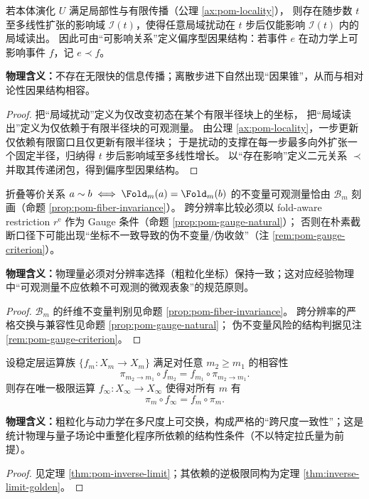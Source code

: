 \begin{physicalaxiom}[局域性与有限传播所诱导的因果律]\label{ax:P3-causality}
若本体演化 \(U\) 满足局部性与有限传播（公理 \ref{ax:pom-locality}），
则存在随步数 \(t\) 至多线性扩张的影响域 \(\mathcal{I}(t)\)，使得任意局域扰动在 \(t\) 步后仅能影响 \(\mathcal{I}(t)\) 内的局域读出。
因此可由“可影响关系”定义偏序型因果结构：若事件 \(e\) 在动力学上可影响事件 \(f\)，记 \(e\prec f\)。

\medskip\noindent\textbf{物理含义：}不存在无限快的信息传播；离散步进下自然出现“因果锥”，从而与相对论性因果结构相容。
\end{physicalaxiom}
\begin{proof}
把“局域扰动”定义为仅改变初态在某个有限半径块上的坐标，
把“局域读出”定义为仅依赖于有限半径块的可观测量。
由公理 \ref{ax:pom-locality}，一步更新仅依赖有限窗口且仅更新有限半径块；
于是扰动的支撑在每一步最多向外扩张一个固定半径，归纳得 \(t\) 步后影响域至多线性增长。
以“存在影响”定义二元关系 \(\prec\) 并取其传递闭包，得到偏序型因果结构。
\end{proof}

\begin{physicalaxiom}[跨分辨率可审计性与规范不变性]\label{ax:P4-gauge}
折叠等价关系 \(a\sim b\iff \Fold_m(a)=\Fold_m(b)\) 的不变量可观测量恰由 \(\mathcal{B}_m\) 刻画（命题 \ref{prop:pom-fiber-invariance}）。
跨分辨率比较必须以 fold-aware restriction \(r^{\mathrm e}\) 作为 Gauge 条件（命题 \ref{prop:pom-gauge-natural}）；
否则在朴素截断口径下可能出现“坐标不一致导致的伪不变量/伪收敛”（注 \ref{rem:pom-gauge-criterion}）。

\medskip\noindent\textbf{物理含义：}物理量必须对分辨率选择（粗粒化坐标）保持一致；这对应经验物理中“可观测量不应依赖不可观测的微观表象”的规范原则。
\end{physicalaxiom}
\begin{proof}
\(\mathcal{B}_m\) 的纤维不变量判别见命题 \ref{prop:pom-fiber-invariance}。
跨分辨率的严格交换与兼容性见命题 \ref{prop:pom-gauge-natural}；
伪不变量风险的结构判据见注 \ref{rem:pom-gauge-criterion}。
\end{proof}

\begin{physicalaxiom}\label{ax:P5-renormalization}
设稳定层运算族 \(\{f_m:X_m\to X_m\}\) 满足对任意 \(m_2\ge m_1\) 的相容性
\[
\pi_{m_2\to m_1}\circ f_{m_2}=f_{m_1}\circ \pi_{m_2\to m_1}.
\]
则存在唯一极限运算 \(f_\infty:X_\infty\to X_\infty\) 使得对所有 \(m\) 有
\[
\pi_m\circ f_\infty=f_m\circ\pi_m.
\]

\medskip\noindent\textbf{物理含义：}粗粒化与动力学在多尺度上可交换，构成严格的“跨尺度一致性”；这是统计物理与量子场论中重整化程序所依赖的结构性条件（不以特定拉氏量为前提）。
\end{physicalaxiom}
\begin{proof}
见定理 \ref{thm:pom-inverse-limit}；其依赖的逆极限同构为定理 \ref{thm:inverse-limit-golden}。
\end{proof}


